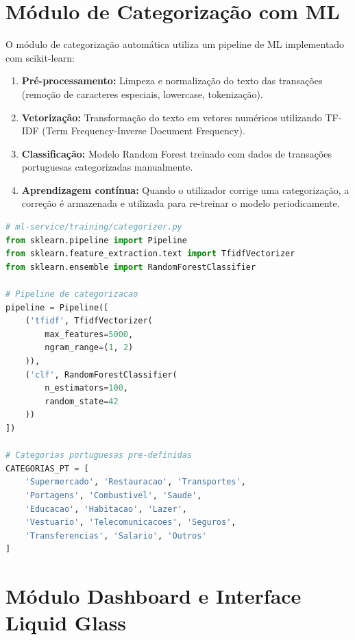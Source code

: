 

\section{Módulo de Categorização com ML}
\label{sec:impl-ml}

O módulo de categorização automática utiliza um pipeline de \ac{ML} implementado com scikit-learn:

\begin{enumerate}
    \item \textbf{Pré-processamento:} Limpeza e normalização do texto das transações (remoção de caracteres especiais, lowercase, tokenização).
    \item \textbf{Vetorização:} Transformação do texto em vetores numéricos utilizando TF-IDF (Term Frequency-Inverse Document Frequency).
    \item \textbf{Classificação:} Modelo Random Forest treinado com dados de transações portuguesas categorizadas manualmente.
    \item \textbf{Aprendizagem contínua:} Quando o utilizador corrige uma categorização, a correção é armazenada e utilizada para re-treinar o modelo periodicamente.
\end{enumerate}


\begin{lstlisting}[caption={Pipeline de categorização (simplificado).},label={lst:ml},language=Python]
# ml-service/training/categorizer.py
from sklearn.pipeline import Pipeline
from sklearn.feature_extraction.text import TfidfVectorizer
from sklearn.ensemble import RandomForestClassifier

# Pipeline de categorizacao
pipeline = Pipeline([
    ('tfidf', TfidfVectorizer(
        max_features=5000,
        ngram_range=(1, 2)
    )),
    ('clf', RandomForestClassifier(
        n_estimators=100,
        random_state=42
    ))
])

# Categorias portuguesas pre-definidas
CATEGORIAS_PT = [
    'Supermercado', 'Restauracao', 'Transportes',
    'Portagens', 'Combustivel', 'Saude',
    'Educacao', 'Habitacao', 'Lazer',
    'Vestuario', 'Telecomunicacoes', 'Seguros',
    'Transferencias', 'Salario', 'Outros'
]
\end{lstlisting}


\section{Módulo Dashboard e Interface Liquid Glass}
\label{sec:impl-dashboard}

